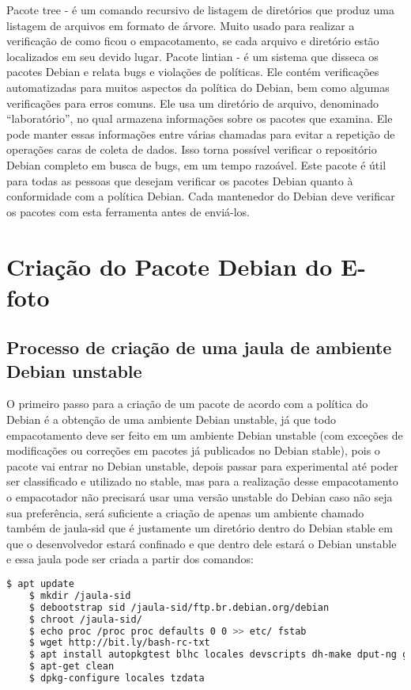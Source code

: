 Pacote tree - é um comando recursivo de listagem de diretórios que produz uma listagem de arquivos em formato de árvore. Muito usado para realizar a verificação de como ficou o empacotamento, se cada arquivo e diretório estão localizados em seu devido lugar. 
Pacote lintian - é um sistema que disseca os pacotes Debian e relata bugs e violações de políticas. Ele contém verificações automatizadas para muitos aspectos da política do Debian, bem como algumas verificações para erros comuns. Ele usa um diretório de arquivo, denominado “laboratório”, no qual armazena informações sobre os pacotes que examina. Ele pode manter essas informações entre várias chamadas para evitar a repetição de operações caras de coleta de dados. Isso torna possível verificar o repositório Debian completo em busca de bugs, em um tempo razoável. Este pacote é útil para todas as pessoas que desejam verificar os pacotes Debian quanto à conformidade com a política Debian. Cada mantenedor do Debian deve verificar os pacotes com esta ferramenta antes de enviá-los.

\section{Criação do Pacote Debian do E-foto}

\subsection{Processo de criação de uma jaula de ambiente Debian unstable}

O primeiro passo para a criação de um pacote de acordo com a política do Debian é a obtenção de uma ambiente Debian unstable, já que todo empacotamento deve ser feito em um ambiente Debian unstable (com exceções de modificações ou correções em pacotes já publicados no Debian stable), pois o pacote vai entrar no Debian unstable, depois passar para experimental até poder ser classificado e utilizado no stable, mas para a realização desse empacotamento o empacotador não precisará usar uma versão unstable do Debian caso não seja sua preferência, será suficiente a criação de apenas um ambiente chamado também de jaula-sid que é justamente um diretório dentro do Debian stable em que o desenvolvedor estará confinado e que dentro dele estará o Debian unstable e essa jaula pode ser criada a partir dos comandos: 

\begin{lstlisting}[language=bash]
	$ apt update
	$ mkdir /jaula-sid
	$ debootstrap sid /jaula-sid/ftp.br.debian.org/debian
	$ chroot /jaula-sid/
	$ echo proc /proc proc defaults 0 0 >> etc/ fstab
	$ wget http://bit.ly/bash-rc-txt
	$ apt install autopkgtest blhc locales devscripts dh-make dput-ng git-buildpackage mc quilt spell tardiff tree lintian
	$ apt-get clean
	$ dpkg-configure locales tzdata
\end{lstlisting}

